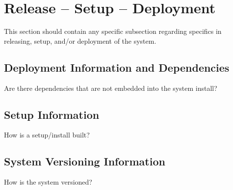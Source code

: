 
\chapter{Release -- Setup -- Deployment}
This section should contain any specific subsection regarding specifics in releasing, 
setup, and/or deployment of the system. 


\section{Deployment Information and Dependencies}
Are there dependencies that are not embedded into the system install? 



\section{Setup Information}
How is a setup/install built? 



\section{System  Versioning Information}
How is the system versioned? 
